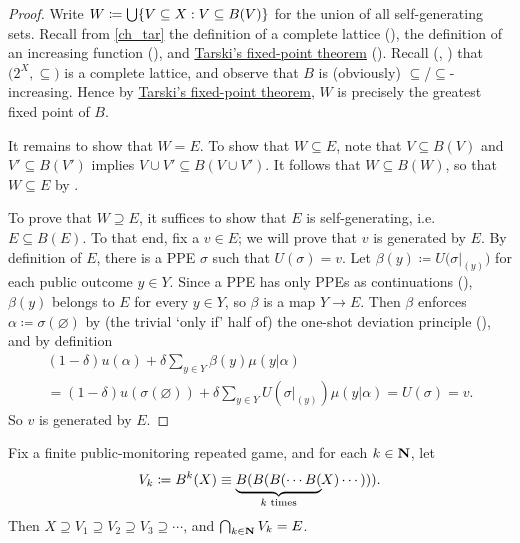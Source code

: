 \begin{proof}
	Write $W \coloneqq \Union \left\{ V \subseteq X : V \subseteq B(V) \right\}$ for the union of all self-generating sets. Recall from \cref{ch_tar} the definition of a complete lattice (), the definition of an increasing function (), and \hyperref[theorem:tarski]{Tarski's fixed-point theorem} (). Recall (, ) that $\bigl( 2^X, \subseteq \bigr)$ is a complete lattice, and observe that $B$ is (obviously) $\subseteq$/$\subseteq$-increasing. Hence by \hyperref[theorem:tarski]{Tarski's fixed-point theorem}, $W$ is precisely the greatest fixed point of $B$.

	It remains to show that $W = E$. To show that $W \subseteq E$, note that $V \subseteq B(V)$ and $V' \subseteq B(V')$ implies $V \cup V' \subseteq B(V \cup V')$. It follows that $W \subseteq B\left( W \right)$, so that $W \subseteq E$ by .

	To prove that $W \supseteq E$, it suffices to show that $E$ is self-generating, i.e. $E \subseteq B(E)$. To that end, fix a $v \in E$; we will prove that $v$ is generated by $E$. By definition of $E$, there is a PPE $\sigma$ such that $U(\sigma)=v$. Let $\beta(y) \coloneqq U\bigl( \sigma|_{(y)} \bigr)$ for each public outcome $y \in Y$. Since a PPE has only PPEs as continuations (), $\beta(y)$ belongs to $E$ for every $y \in Y$, so $\beta$ is a map $Y \to E$. Then $\beta$ enforces $\alpha \coloneqq \sigma(\varnothing)$ by (the trivial `only if' half of) the one-shot deviation principle (), and by definition
	\begin{multline*}
		(1-\delta) u(\alpha)
		+ \delta \sum_{y \in Y} \beta(y) \mu(y|\alpha)
		\\
		= (1-\delta) u(\sigma(\varnothing))
		+ \delta \sum_{y \in Y} U\left( \sigma|_{(y)} \right) \mu(y|\alpha)
		= U(\sigma)
		= v .
	\end{multline*}
	So $v$ is generated by $E$.
\end{proof}

\begin{proposition}
	\label{proposition:ppe_algo}
	Fix a finite public-monitoring repeated game, and for each $k \in \mathbf{N}$, let
	\begin{equation*}
		V_k
		\coloneqq B^k(X)
		\equiv \underbrace{B(B(B(\cdots B(}_{\text{$k$ times}}\hspace{-2pt}X)\cdots))) .
	\end{equation*}
	Then $X \supseteq V_1 \supseteq V_2 \supseteq V_3 \supseteq \cdots$, and $\bigcap_{k \in \mathbf{N}} V_k = E$.
\end{proposition}

